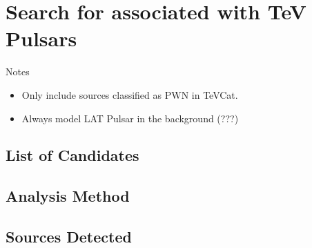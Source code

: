 
\chapter{Search for  associated with TeV Pulsars}

Notes 
\begin{itemize}
  \item Only include sources classified as PWN in TeVCat.
  \item Always model LAT Pulsar in the background (???)
\end{itemize}

\section{List of Candidates}

\section{Analysis Method}

\section{Sources Detected}
